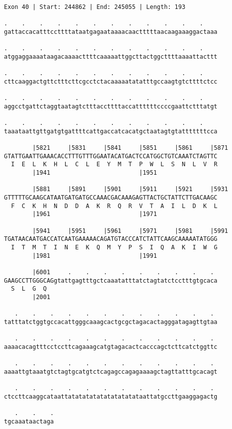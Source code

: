 \documentclass{article}
\begin{document}
\begin{Verbatim}
Exon 40 | Start: 244862 | End: 245055 | Length: 193
 
.    .    .    .    .    .    .    .    .    .    .    .    
gattaccacatttccttttataatgagaataaaacaactttttaacaagaaaggactaaa
  
.    .    .    .    .    .    .    .    .    .    .    .    
atggaggaaaataagacaaaacttttcaaaaattggcttactggcttttaaaattacttt
  
.    .    .    .    .    .    .    .    .    .    .    .    
cttcaaggactgttctttcttcgcctctacaaaaatatatttgccaagtgtcttttctcc
  
.    .    .    .    .    .    .    .    .    .    .    .    
aggcctgattctaggtaatagtctttaccttttaccattttttccccgaattctttatgt
  
.    .    .    .    .    .    .    .    .    .    .    .    
taaataattgttgatgtgattttcattgaccatcacatgctaatagtgtatttttttcca
  
        |5821     |5831     |5841     |5851     |5861     |5871
GTATTGAATTGAAACACCTTTGTTTGGAATACATGACTCCATGGCTGTCAAATCTAGTTC
  I  E  L  K  H  L  C  L  E  Y  M  T  P  W  L  S  N  L  V  R
        |1941                         |1951                 
  
        |5881     |5891     |5901     |5911     |5921     |5931
GTTTTTGCAAGCATAATGATGATGCCAAACGACAAAGAGTTACTGCTATTCTTGACAAGC
  F  C  K  H  N  D  D  A  K  R  Q  R  V  T  A  I  L  D  K  L
        |1961                         |1971                 
  
        |5941     |5951     |5961     |5971     |5981     |5991
TGATAACAATGACCATCAATGAAAAACAGATGTACCCATCTATTCAAGCAAAAATATGGG
  I  T  M  T  I  N  E  K  Q  M  Y  P  S  I  Q  A  K  I  W  G
        |1981                         |1991                 
  
        |6001     .    .    .    .    .    .    .    .    . 
GAAGCCTTGGGCAGgtattgagtttgctcaaatatttatctagtatctcctttgtgcaca
  S  L  G  Q                                                
        |2001                                               
  
   .    .    .    .    .    .    .    .    .    .    .    . 
tatttatctggtgccacattgggcaaagcactgcgctagacactagggatagagttgtaa
  
   .    .    .    .    .    .    .    .    .    .    .    . 
aaaacacagtttcctccttcagaaagcatgtagacactcacccagctcttcatctggttc
  
   .    .    .    .    .    .    .    .    .    .    .    . 
aaaattgtaaatgtctagtgcatgtctcagagccagagaaaagctagttatttgcacagt
  
   .    .    .    .    .    .    .    .    .    .    .    . 
ctccttcaaggcataattatatatatatatatatatataattatgccttgaaggagactg
  
   .    .    .
tgcaaataactaga
\end{Verbatim}
\end{document}
